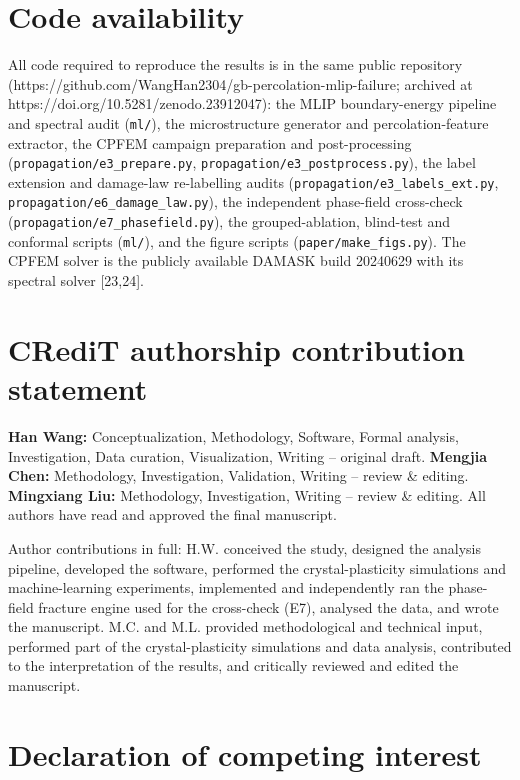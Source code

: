 \documentclass[preprint,12pt]{elsarticle}
\begin{document}
\section*{Code availability}

{\sloppy
All code required to reproduce the results is in the same public repository (\mbox{https://github.com/WangHan2304/gb-percolation-mlip-failure}; archived at \mbox{https://doi.org/10.5281/zenodo.23912047}): the MLIP boundary-energy pipeline and spectral audit (\texttt{ml/}), the microstructure generator and percolation-feature extractor, the CPFEM campaign preparation and post-processing (\texttt{propagation/e3\_prepare.py}, \texttt{propagation/e3\_postprocess.py}), the label extension and damage-law re-labelling audits (\texttt{propagation/e3\_labels\_ext.py}, \texttt{propagation/e6\_damage\_law.py}), the independent phase-field cross-check (\texttt{propagation/e7\_phasefield.py}), the grouped-ablation, blind-test and conformal scripts (\texttt{ml/}), and the figure scripts (\texttt{paper/make\_figs.py}). The CPFEM solver is the publicly available DAMASK build 20240629 with its spectral solver [23,24].\par}

\section*{CRediT authorship contribution statement}

\textbf{Han Wang:} Conceptualization, Methodology, Software, Formal analysis, Investigation, Data curation, Visualization, Writing -- original draft. \textbf{Mengjia Chen:} Methodology, Investigation, Validation, Writing -- review \& editing. \textbf{Mingxiang Liu:} Methodology, Investigation, Writing -- review \& editing. All authors have read and approved the final manuscript.

Author contributions in full: H.W. conceived the study, designed the analysis pipeline, developed the software, performed the crystal-plasticity simulations and machine-learning experiments, implemented and independently ran the phase-field fracture engine used for the cross-check (E7), analysed the data, and wrote the manuscript. M.C. and M.L. provided methodological and technical input, performed part of the crystal-plasticity simulations and data analysis, contributed to the interpretation of the results, and critically reviewed and edited the manuscript.

\section*{Declaration of competing interest}
\end{document}

